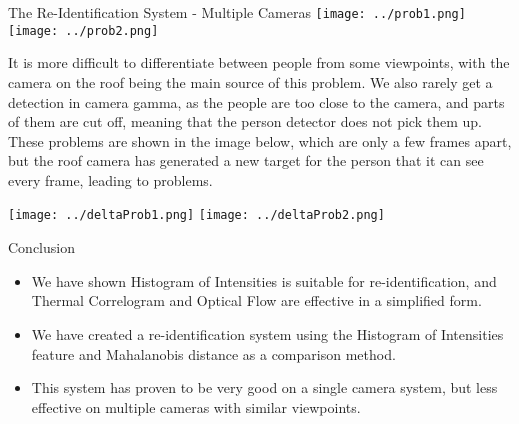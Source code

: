 \documentclass[final]{beamer}
\begin{document}
\begin{frame}{}
\begin{columns}[t]
\begin{column}{.49\linewidth}
\begin{block}{The Re-Identification System - Multiple Cameras}
 		\texttt{[image: ../prob1.png]}  
 		\hspace{.4cm}
        \texttt{[image: ../prob2.png]}  
        
        \justify It is more difficult to differentiate between people from some viewpoints, with the camera on the roof being the main source of this problem. We also rarely get a detection in camera gamma, as the people are too close to the camera, and parts of them are cut off, meaning that the person detector does not pick them up. These problems are shown in the image below, which are only a few frames apart, but the roof camera has generated a new target for the person that it can see every frame, leading to problems.
        
        \texttt{[image: ../deltaProb1.png]}
        \hspace{.4cm}
        \texttt{[image: ../deltaProb2.png]}  
        \end{block}
        
        \begin{block}{Conclusion}
        \begin{itemize}
         \item We have shown Histogram of Intensities is suitable for re-identification, and Thermal Correlogram and Optical Flow are effective in a simplified form. 
         \item We have created a re-identification system using the Histogram of Intensities feature and Mahalanobis distance as a comparison method. 
         
         \item This system has proven to be very good on a single camera system, but less effective on multiple cameras with similar viewpoints.
        \end{itemize}
        \end{block}

        \end{column}
    \end{columns}
    
  \end{frame}
\end{document}
